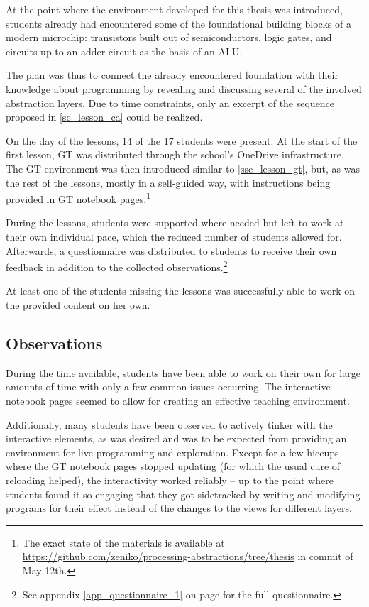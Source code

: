 At the point where the environment developed for this thesis was introduced, students already had encountered some of the foundational building blocks of a modern microchip: transistors built out of semiconductors, logic gates, and circuits up to an adder circuit as the basis of an \ac{ALU}.

The plan was thus to connect the already encountered foundation with their knowledge about programming by revealing and discussing several of the involved abstraction layers. Due to time constraints, only an excerpt of the sequence proposed in \ref{sc_lesson_ca} could be realized.

On the day of the lessons, 14 of the 17 students were present. At the start of the first lesson, \ac{GT} was distributed through the school's OneDrive infrastructure. The \ac{GT} environment was then introduced similar to \ref{ssc_lesson_gt}, but, as was the rest of the lessons, mostly in a self-guided way, with instructions being provided in \ac{GT} notebook pages.\footnote{The exact state of the materials is available at \url{https://github.com/zeniko/processing-abstractions/tree/thesis} in commit  of May 12th.}

During the lessons, students were supported where needed but left to work at their own individual pace, which the reduced number of students allowed for. Afterwards, a questionnaire was distributed to students to receive their own feedback in addition to the collected observations.\footnote{See appendix \ref{app_questionnaire_1} on page \pageref{app_questionnaire_1} for the full questionnaire.}

At least one of the students missing the lessons was successfully able to work on the provided content on her own.


\subsection{Observations}

During the time available, students have been able to work on their own for large amounts of time with only a few common issues occurring. The interactive notebook pages seemed to allow for creating an effective teaching environment.

Additionally, many students have been observed to actively tinker with the interactive elements, as was desired and was to be expected from providing an environment for live programming and exploration. Except for a few hiccups where the \ac{GT} notebook pages stopped updating (for which the usual cure of reloading helped), the interactivity worked reliably -- up to the point where students found it so engaging that they got sidetracked by writing and modifying programs for their effect instead of the changes to the views for different layers.

